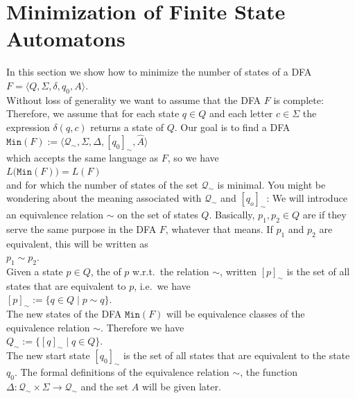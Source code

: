 \section{Minimization of Finite State Automatons}
In this section we show how to minimize the number of states of a \textsc{DFA}
\\[0.2cm]
\hspace*{1.3cm}
$F = \langle Q, \Sigma, \delta, q_0, A \rangle$.
\\[0.2cm]
Without loss of generality we want to assume that the \textsc{DFA} $F$ is complete: Therefore, we assume that
for each state $q \in Q$ and each letter $c \in \Sigma$ the expression $\delta(q, c)$ 
returns a state of $Q$.  Our goal is to find a \textsc{DFA}
\\[0.2cm]
\hspace*{1.3cm}
$\mathtt{Min}(F) := \bigl\langle \mathcal{Q}_\sim, \Sigma, \Delta, [q_0]_\sim, \widehat{A} \bigr\rangle$
\\[0.2cm]
which accepts the same language as  $F$, so we have 
\\[0.2cm]
\hspace*{1.3cm}
$L\bigl(\mathtt{Min}(F)\bigr) = L(F)$
\\[0.2cm]
and for which the number of states of the set $\mathcal{Q}_\sim$ is minimal.  You might be wondering about the
meaning associated with $\mathcal{Q}_\sim$ and $[q_o]_\sim$:  We will introduce an equivalence relation
$\sim$ on the set of states $Q$.  Basically, $p_1, p_2\in Q$ are  if they serve the same
purpose in the \textsc{DFA} $F$, whatever that means.  If $p_1$ and $p_2$ are equivalent, this will be written as
\\[0.2cm]
\hspace*{1.3cm}
$p_1 \sim p_2$.
\\[0.2cm]
Given a state $p \in Q$, the  of $p$ w.r.t.~the relation $\sim$, written $[p]_\sim$ is the set of all states that
are equivalent to $p$, i.e.~we have
\\[0.2cm]
\hspace*{1.3cm}
$[p]_\sim := \{ q \in Q \mid p \sim q \}$.
\\[0.2cm]
The new states of the \textsc{DFA} $\texttt{Min}(F)$ will be equivalence classes of the equivalence relation
$\sim$.  Therefore we have
\\[0.2cm]
\hspace*{1.3cm}
$Q_\sim := \bigl\{ [q]_\sim \;\big|\; q \in Q \bigl\}$.
\\[0.2cm]
The new start state $[q_0]_\sim$ is the set of all states that are equivalent to the state $q_0$.  The formal definitions of the
equivalence relation $\sim$, the function $\Delta: \mathcal{Q}_\sim \times \Sigma \rightarrow \mathcal{Q}_\sim$
and the set $\widehat{A}$ will be given later.

